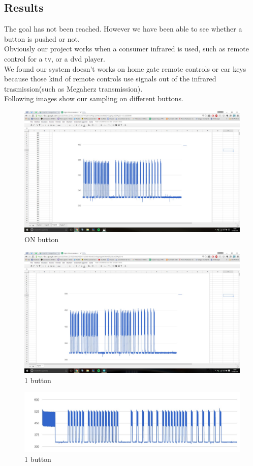 \subsection{Results}

The goal has not been reached. However we have been able to see whether a button is pushed or not.\\
Obviously our project works when a consumer infrared is used, such as remote control for a tv, or a dvd player.\\
We found our system doesn't works on home gate remote controls or car keys because those kind of remote controls use signals out of the infrared trasmission(such as Megaherz transmission).\\
Following images show our sampling on different buttons.

\begin{figure}[h]
	\centering
	\includegraphics[scale=0.3]{graphs/onButton_2.jpg}%
	\caption{ON button}

\end{figure}

\begin{figure}[h]
	\centering
	\includegraphics[scale=0.3]{graphs/1Button.jpg}%
	\caption{1 button}
		
\end{figure}

\begin{figure}[h]
	\centering
	\includegraphics[scale=0.3]{graphs/2Button.jpg}%
	\caption{1 button}
	
\end{figure}
